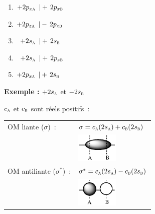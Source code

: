 \begin{minipage}{4cm}
\begin{enumerate}[\bf 1)]
\item $+2p_{x\textsc{a}}\ \, |+\,2p_{x\textsc{b}}$
\item $+2p_{z\textsc{a}}\ \, |-\,2p_{z\textsc{b}}$
\item $\ \, +2s_\textsc{a}\ \, |+\,2s_\textsc{b}$
\item $\ \, +2s_\textsc{a}\ \, |+\,2p_{z\textsc{b}}$
\item $+2p_{x\textsc{a}}\ \, |+\,2s_\textsc{b}$
\end{enumerate}
\end{minipage}%
%
\begin{minipage}{5cm}
\textbf{Exemple :}  $+2s_\textsc{a}$ et $-2s_\textsc{b}$

$c_\textsc{a}$ et $c_\textsc{b}$ sont r\'eels positifs~:

\begin{tabular}{ll}
OM liante ($\sigma$)~: &
$\sigma =  c_\textsc{a} (2s_\textsc{a}) + c_\textsc{b}(2s_\textsc{b})$ \\
& \includegraphics[width=2.0cm]{figure/sigma.eps} \\[0.5cm]
OM antiliante ($\sigma^*$)~: &
$\sigma^* = c_\textsc{a} (2s_\textsc{a}) - c_\textsc{b}(2s_\textsc{b})$ \\
& \includegraphics[width=2.0cm]{figure/sigma_star.eps} \\
\end{tabular}
\end{minipage}

